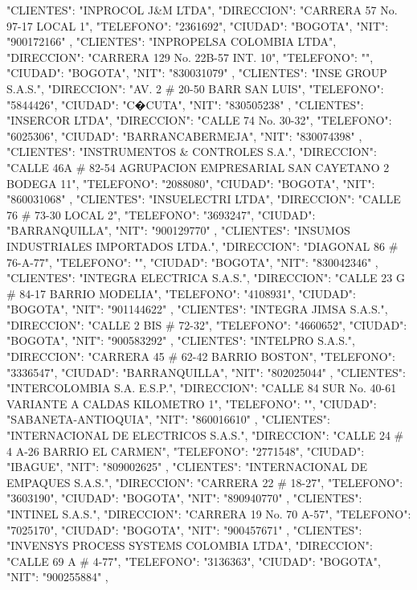    {
   "CLIENTES": "INPROCOL J&M LTDA",
   "DIRECCION": "CARRERA 57 No. 97-17 LOCAL 1",
   "TELEFONO": "2361692",
   "CIUDAD": "BOGOTA",
   "NIT": "900172166"
   },
   {
   "CLIENTES": "INPROPELSA COLOMBIA LTDA",
   "DIRECCION": "CARRERA 129 No. 22B-57 INT. 10",
   "TELEFONO": "",
   "CIUDAD": "BOGOTA",
   "NIT": "830031079"
   },
   {
   "CLIENTES": "INSE GROUP S.A.S.",
   "DIRECCION": "AV. 2 # 20-50 BARR SAN LUIS",
   "TELEFONO": "5844426",
   "CIUDAD": "C�CUTA",
   "NIT": "830505238"
   },
   {
   "CLIENTES": "INSERCOR LTDA",
   "DIRECCION": "CALLE 74 No. 30-32",
   "TELEFONO": "6025306",
   "CIUDAD": "BARRANCABERMEJA",
   "NIT": "830074398"
   },
   {
   "CLIENTES": "INSTRUMENTOS & CONTROLES S.A.",
   "DIRECCION": "CALLE 46A # 82-54 AGRUPACION EMPRESARIAL SAN CAYETANO 2 BODEGA 11",
   "TELEFONO": "2088080",
   "CIUDAD": "BOGOTA",
   "NIT": "860031068"
   },
   {
   "CLIENTES": "INSUELECTRI LTDA",
   "DIRECCION": "CALLE 76 # 73-30 LOCAL 2",
   "TELEFONO": "3693247",
   "CIUDAD": "BARRANQUILLA",
   "NIT": "900129770"
   },
   {
   "CLIENTES": "INSUMOS INDUSTRIALES IMPORTADOS LTDA.",
   "DIRECCION": "DIAGONAL 86 # 76-A-77",
   "TELEFONO": "",
   "CIUDAD": "BOGOTA",
   "NIT": "830042346"
   },
   {
   "CLIENTES": "INTEGRA ELECTRICA S.A.S.",
   "DIRECCION": "CALLE 23 G # 84-17 BARRIO MODELIA",
   "TELEFONO": "4108931",
   "CIUDAD": "BOGOTA",
   "NIT": "901144622"
   },
   {
   "CLIENTES": "INTEGRA JIMSA S.A.S.",
   "DIRECCION": "CALLE 2 BIS # 72-32",
   "TELEFONO": "4660652",
   "CIUDAD": "BOGOTA",
   "NIT": "900583292"
   },
   {
   "CLIENTES": "INTELPRO S.A.S.",
   "DIRECCION": "CARRERA 45 # 62-42 BARRIO BOSTON",
   "TELEFONO": "3336547",
   "CIUDAD": "BARRANQUILLA",
   "NIT": "802025044"
   },
   {
   "CLIENTES": "INTERCOLOMBIA S.A. E.S.P.",
   "DIRECCION": "CALLE 84 SUR No. 40-61 VARIANTE A CALDAS KILOMETRO 1",
   "TELEFONO": "",
   "CIUDAD": "SABANETA-ANTIOQUIA",
   "NIT": "860016610"
   },
   {
   "CLIENTES": "INTERNACIONAL DE ELECTRICOS S.A.S.",
   "DIRECCION": "CALLE 24 # 4 A-26 BARRIO EL CARMEN",
   "TELEFONO": "2771548",
   "CIUDAD": "IBAGUE",
   "NIT": "809002625"
   },
   {
   "CLIENTES": "INTERNACIONAL DE EMPAQUES S.A.S.",
   "DIRECCION": "CARRERA 22 # 18-27",
   "TELEFONO": "3603190",
   "CIUDAD": "BOGOTA",
   "NIT": "890940770"
   },
   {
   "CLIENTES": "INTINEL S.A.S.",
   "DIRECCION": "CARRERA 19 No. 70 A-57",
   "TELEFONO": "7025170",
   "CIUDAD": "BOGOTA",
   "NIT": "900457671"
   },
   {
   "CLIENTES": "INVENSYS PROCESS SYSTEMS COLOMBIA LTDA",
   "DIRECCION": "CALLE 69 A # 4-77",
   "TELEFONO": "3136363",
   "CIUDAD": "BOGOTA",
   "NIT": "900255884"
   },

